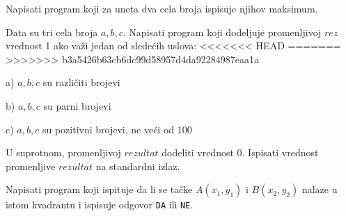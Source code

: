 \begin{Exercise}[label=p1_17]
Napisati program koji za uneta dva cela broja ispisuje njihov maksimum. \\
\end{Exercise}
\begin{Answer}[ref=p1_17]
\end{Answer}

\begin{Exercise}[label=p1_18]
Data su tri cela broja $a, b, c$. Napisati program koji dodeljuje promenljivoj $rez$ vrednost 1
ako važi jedan od sledećih uslova:
<<<<<<< HEAD
=======
>>>>>>> b3a5426b63cb6dc99d58957d4da92284987eaa1a
\begin{description}
\item{a)} $a, b, c$ su različiti brojevi
\item{b)} $a, b, c$ su parni brojevi
\item{c)} $a, b, c$ su pozitivni brojevi, ne veći od 100
\end{description}
U suprotnom, promenljivoj $rezultat$ dodeliti vrednost 0. Ispisati vrednost promenljive $rezultat$ na standardni izlaz. \\
\end{Exercise}
\begin{Answer}[ref=p1_18]
\end{Answer}

\begin{Exercise}[label=p1_19]
Napisati program koji ispituje da li se ta\v cke $A(x_1, y_1)$ i $B(x_2,
y_2)$ nalaze u istom kvadrantu i ispisuje odgovor
\verb|DA| ili \verb|NE|. \\
\end{Exercise}
\begin{Answer}[ref=p1_19]
\end{Answer}

